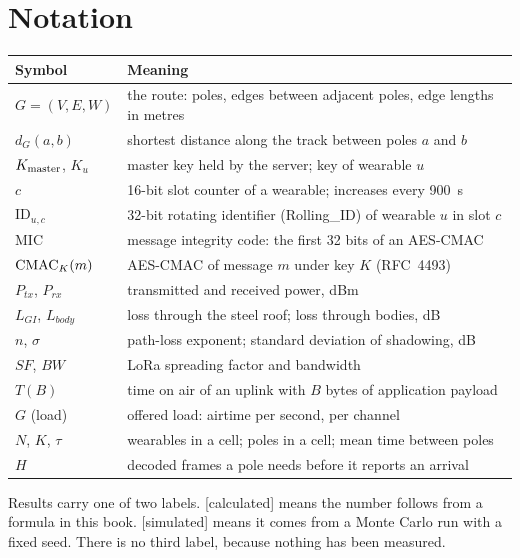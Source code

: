\documentclass[11pt,a4paper,twoside,openany]{book}
\newcommand{\lbl}[1]{\textsf{\footnotesize\color{rsmuted}[#1]}}
\begin{document}
\chapter*{Notation}
\begin{center}\small\begin{tabular}{@{}ll@{}}\toprule Symbol & Meaning\\\midrule
$G=(V,E,W)$ & the route: poles, edges between adjacent poles, edge lengths in metres\\
$d_G(a,b)$ & shortest distance along the track between poles $a$ and $b$\\
$K_{\mathrm{master}}$, $K_u$ & master key held by the server; key of wearable $u$\\
$c$ & 16-bit slot counter of a wearable; increases every 900~s\\
$\mathrm{ID}_{u,c}$ & 32-bit rotating identifier (Rolling\_ID) of wearable $u$ in slot $c$\\
MIC & message integrity code: the first 32 bits of an AES-CMAC\\
$\operatorname{CMAC}_{K}\!\left(m\right)$ & AES-CMAC of message $m$ under key $K$ (RFC~4493)\\
$P_{tx}$, $P_{rx}$ & transmitted and received power, dBm\\
$L_{GI}$, $L_{body}$ & loss through the steel roof; loss through bodies, dB\\
$n$, $\sigma$ & path-loss exponent; standard deviation of shadowing, dB\\
$SF$, $BW$ & LoRa spreading factor and bandwidth\\
$T(B)$ & time on air of an uplink with $B$ bytes of application payload\\
$G$ (load) & offered load: airtime per second, per channel\\
$N$, $K$, $\tau$ & wearables in a cell; poles in a cell; mean time between poles\\
$H$ & decoded frames a pole needs before it reports an arrival\\
\bottomrule\end{tabular}\end{center}
\noindent Results carry one of two labels. \lbl{calculated} means the number follows from a formula in this book.
\lbl{simulated} means it comes from a Monte Carlo run with a fixed seed. There is no third label, because nothing has
been measured.

\tableofcontents
\mainmatter

\end{document}
